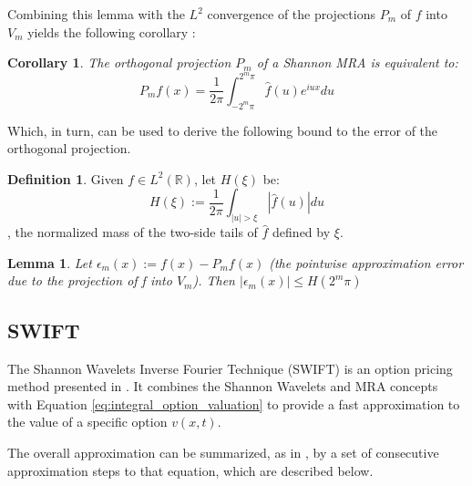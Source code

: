 \documentclass[12,twoside]{mammeTFM}
\newtheorem{lem}[thm]{Lemma}
\newtheorem{cor}[thm]{Corollary}
\theoremstyle{definition}
\newtheorem{definition}[thm]{Definition}
\theoremstyle{remark}
\newcommand{\R}{\ensuremath{\mathbb{R}}}
\begin{document}
Combining this lemma with the $L^2$ convergence of the projections $P_m$ of $f$ into $V_m$ yields the following corollary \cite{mar17}:
\begin{cor} The orthogonal projection $P_m$ of a Shannon MRA is equivalent to:
\begin{equation}
P_m f(x) = \dfrac{1}{2 \pi} \int_{-2^m \pi}^{2^m \pi} \hat{f}(u) e^{i u x} d u
\end{equation}
\end{cor}
Which, in turn, can be used to derive the following bound to the error of the orthogonal projection.
\begin{definition}Given $f \in L^2(\R)$, let $H(\xi)$ be:
\begin{equation}
H(\xi) := \dfrac{1}{2 \pi} \int_{|u| > \xi}\left|\hat{f}(u)\right| du
\end{equation}
, the normalized mass of the two-side tails of $\hat{f}$ defined by $\xi$.
\end{definition}

\begin{lem} \label{lem:projection_error} Let $\epsilon_m(x) := f(x) - P_m f(x)$ (the pointwise approximation error due to the projection of f into $V_m$). Then $|\epsilon_m(x)| \leq H(2^m \pi)$ \cite{mar17}
\end{lem}

\subsection{SWIFT} \label{chapter:swift}
The Shannon Wavelets Inverse Fourier Technique (SWIFT) is an option pricing method presented in \cite{Ortiz-Gracia2016}. It combines the Shannon Wavelets and MRA concepts with Equation \ref{eq:integral_option_valuation} to provide a fast approximation to the value of a specific option $v(x, t)$.

The overall approximation can be summarized, as in \cite{mar17}, by a set of consecutive approximation steps to that equation, which are described below.
\end{document}
